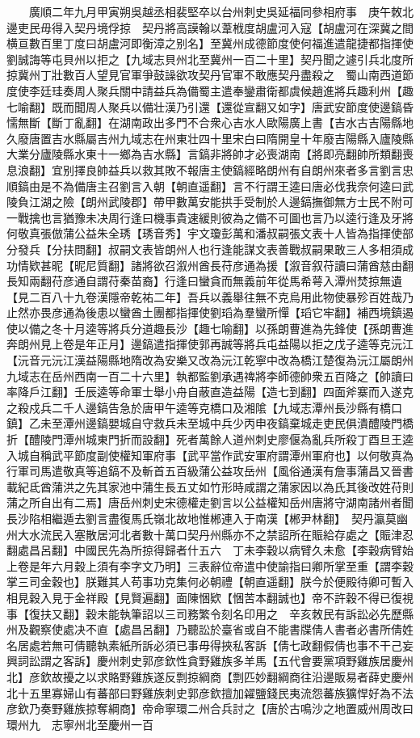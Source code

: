 　　廣順二年九月甲寅朔吳越丞相裴堅卒以台州刺史吳延福同參相府事　庚午敇北邊吏民毋得入契丹境俘掠　契丹將高謨翰以葦栰度胡盧河入寇【胡盧河在深冀之間横亘數百里丁度曰胡盧河即衡漳之别名】至冀州成德節度使何福進遣龍捷都指揮使劉誠誨等屯貝州以拒之【九域志貝州北至冀州一百二十里】契丹聞之遽引兵北度所掠冀州丁壯數百人望見官軍爭鼓譟欲攻契丹官軍不敢應契丹盡殺之　蜀山南西道節度使李廷珪奏周人聚兵關中請益兵為備蜀主遣奉鑾肅衛都虞候趙進將兵趣利州【趣七喻翻】既而聞周人聚兵以備壮漢乃引還【還從宣翻又如字】唐武安節度使邊鎬昏懦無斷【斷丁亂翻】在湖南政出多門不合衆心吉水人歐陽廣上書【吉水古吉陽縣地久廢唐置吉水縣屬吉州九域志在州東壮四十里宋白曰隋開皇十年廢吉陽縣入廬陵縣大業分廬陵縣水東十一鄉為吉水縣】言鎬非將帥才必喪湖南【將即亮翻帥所類翻喪息浪翻】宜别擇良帥益兵以救其敗不報唐主使鎬經略朗州有自朗州來者多言劉言忠順鎬由是不為備唐主召劉言入朝【朝直遥翻】言不行謂王逵曰唐必伐我奈何逵曰武陵負江湖之險【朗州武陵郡】帶甲數萬安能拱手受制於人邊鎬撫御無方士民不附可一戰擒也言猶豫未决周行逢曰機事貴速緩則彼為之備不可圖也言乃以逵行逢及牙將何敬真張倣蒲公益朱全琇【琇音秀】宇文瓊彭萬和潘叔嗣張文表十人皆為指揮使部分發兵【分扶問翻】叔嗣文表皆朗州人也行逢能謀文表善戰叔嗣果敢三人多相須成功情欵甚昵【昵尼質翻】諸將欲召溆州酋長苻彦通為援【溆音叙苻讀曰蒲酋慈由翻長知兩翻苻彦通自謂苻秦苗裔】行逢曰蠻貪而無義前年從馬希萼入潭州焚掠無遺【見二百八十九卷漢隱帝乾祐二年】吾兵以義舉往無不克烏用此物使暴殄百姓哉乃止然亦畏彦通為後患以蠻酋土團都指揮使劉瑫為羣蠻所憚【瑫它牢翻】補西境鎮遏使以備之冬十月逵等將兵分道趣長沙【趣七喻翻】以孫朗曹進為先鋒使【孫朗曹進奔朗州見上卷是年正月】邊鎬遣指揮使郭再誠等將兵屯益陽以拒之戊子逵等克沅江【沅音元沅江漢益陽縣地隋改為安樂又改為沅江乾寧中改為橋江楚復為沅江屬朗州九域志在岳州西南一百二十六里】執都監劉承遇禆將李師德帥衆五百降之【帥讀曰率降戶江翻】壬辰逵等命軍士舉小舟自蔽直造益陽【造七到翻】四面斧寨而入遂克之殺戍兵二千人邊鎬告急於唐甲午逵等克橋口及湘隂【九域志潭州長沙縣有橋口鎮】乙未至潭州邊鎬嬰城自守救兵未至城中兵少丙申夜鎬棄城走吏民俱潰醴陵門橋折【醴陵門潭州城東門折而設翻】死者萬餘人道州刺史廖偃為亂兵所殺丁酉旦王逵入城自稱武平節度副使權知軍府事【武平當作武安軍府謂潭州軍府也】以何敬真為行軍司馬遣敬真等追鎬不及斬首五百級蒲公益攻岳州【風俗通漢有詹事蒲昌又晉書載紀氐酋蒲洪之先其家池中蒲生長五丈如竹形時咸謂之蒲家因以為氏其後改姓苻則蒲之所自出有二焉】唐岳州刺史宋德權走劉言以公益權知岳州唐將守湖南諸州者聞長沙陷相繼遁去劉言盡復馬氏嶺北故地惟郴連入于南漢【郴尹林翻】　契丹瀛莫幽州大水流民入塞散居河北者數十萬口契丹州縣亦不之禁詔所在賑給存處之【賑津忍翻處昌呂翻】中國民先為所掠得歸者什五六　丁未李穀以病臂久未愈【李穀病臂始上卷是年六月穀上須有李字文乃明】三表辭位帝遣中使諭指曰卿所掌至重【謂李穀掌三司金穀也】朕難其人苟事功克集何必朝禮【朝直遥翻】朕今於便殿待卿可暫入相見穀入見于金祥殿【見賢遍翻】面陳悃欵【悃苦本翻誠也】帝不許穀不得已復視事【復扶又翻】穀未能執筆詔以三司務繁令刻名印用之　辛亥敇民有訴訟必先歷縣州及觀察使處决不直【處昌呂翻】乃聽訟於臺省或自不能書牒倩人書者必書所倩姓名居處若無可倩聽執素紙所訴必須已事毋得挾私客訴【倩七政翻假倩也事不干己妄興詞訟謂之客訴】慶州刺史郭彦欽性貪野雞族多羊馬【五代會要黨項野雞族居慶州北】彦欽故擾之以求賂野雞族遂反剽掠綱商【剽匹妙翻綱商往沿邊販易者薛史慶州北十五里寡婦山有蕃部曰野雞族刺史郭彦欽擅加糴鹽錢民夷流怨蕃族獷悍好為不法彦欽乃奏野雞族掠奪綱商】帝命寧環二州合兵討之【唐於古鳴沙之地置威州周改曰環州九　志寧州北至慶州一百